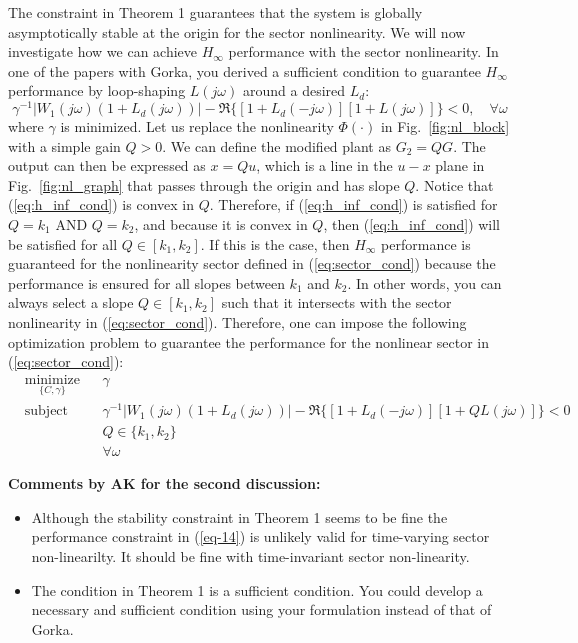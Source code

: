 \documentclass[12pt]{article}
\begin{document}
The constraint in Theorem 1 guarantees that the system is globally asymptotically stable at the origin for the sector nonlinearity. We will now investigate how we can achieve $H_\infty$ performance with the sector nonlinearity. In one of the papers with Gorka, you derived a sufficient condition to guarantee $H_\infty$ performance by loop-shaping $L(j\omega)$ around a desired $L_d$:
\begin{equation} \label{eq:h_inf_cond}
\gamma^{-1}|W_1(j\omega)(1+L_d(j\omega))|  -  \Re \{[1+L_d(-j\omega)][1+L(j\omega)]\} < 0, \quad \forall \omega
\end{equation}
where $\gamma$ is minimized. Let us replace the nonlinearity $\Phi(\cdot)$ in Fig.~\ref{fig:nl_block} with a simple gain $Q > 0$. We can define the modified plant as $G_2 = QG$. The output can then be expressed as $x = Qu$, which is a line in the $u-x$ plane in Fig.~\ref{fig:nl_graph} that passes through the origin and has slope $Q$. Notice that (\ref{eq:h_inf_cond}) is convex in $Q$. Therefore, if (\ref{eq:h_inf_cond}) is satisfied for $Q = k_1$ AND $Q = k_2$, and because it is convex in $Q$, then (\ref{eq:h_inf_cond}) will be satisfied for all $Q \in [k_1,k_2]$. If this is the case, then $H_\infty$ performance is guaranteed for the nonlinearity sector defined in (\ref{eq:sector_cond}) because the performance is ensured for all slopes between $k_1$ and $k_2$. In other words, you can always select a slope $Q \in [k_1,k_2]$ such that it intersects with the sector nonlinearity in (\ref{eq:sector_cond}). Therefore, one can impose the following optimization problem to guarantee the performance for the nonlinear sector in (\ref{eq:sector_cond}):
\begin{equation}  \label{eq-14}
\begin{aligned}
& \underset{ \{C,\gamma\}}{\text{minimize}}
& & \gamma  \\
& \text{subject to:} & & \gamma^{-1}|W_1(j\omega)(1+L_d(j\omega))|  -  \Re \{[1+L_d(-j\omega)][1+QL(j\omega)]\} < 0  \\ 
& & & Q \in \{ k_1,k_2\} \\
& & & \forall \omega
\end{aligned}
\end{equation}

{\bf Comments by AK for the second discussion:} 
\begin{itemize}
	\item Although the stability constraint in Theorem 1 seems to be fine the performance constraint in (\ref{eq-14}) is unlikely valid for time-varying sector non-linearilty. It should be fine with time-invariant sector non-linearity. 
	\item The condition in Theorem 1 is a sufficient condition. You could develop a necessary and sufficient condition using your formulation instead of that of Gorka.
\end{itemize}


\end{document}
